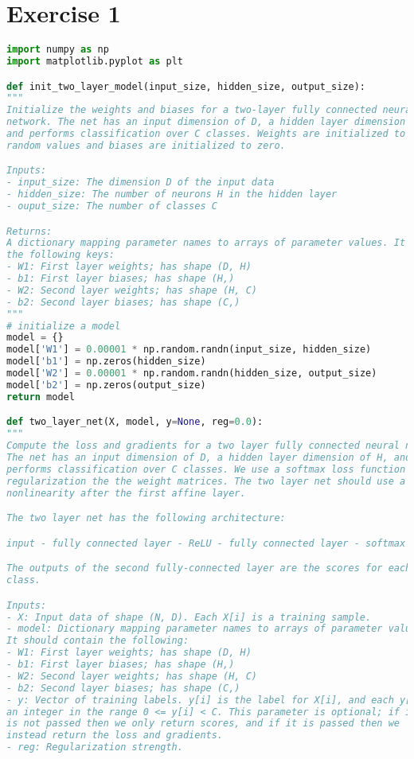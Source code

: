 \chapter{Exercise 1}








\begin{lstlisting}[language=Python, label=lst:neuralnet.py, caption={neural\_net.py}, basicstyle=\tiny]
import numpy as np
import matplotlib.pyplot as plt

def init_two_layer_model(input_size, hidden_size, output_size):
"""
Initialize the weights and biases for a two-layer fully connected neural
network. The net has an input dimension of D, a hidden layer dimension of H,
and performs classification over C classes. Weights are initialized to small
random values and biases are initialized to zero.

Inputs:
- input_size: The dimension D of the input data
- hidden_size: The number of neurons H in the hidden layer
- ouput_size: The number of classes C

Returns:
A dictionary mapping parameter names to arrays of parameter values. It has
the following keys:
- W1: First layer weights; has shape (D, H)
- b1: First layer biases; has shape (H,)
- W2: Second layer weights; has shape (H, C)
- b2: Second layer biases; has shape (C,)
"""
# initialize a model
model = {}
model['W1'] = 0.00001 * np.random.randn(input_size, hidden_size)
model['b1'] = np.zeros(hidden_size)
model['W2'] = 0.00001 * np.random.randn(hidden_size, output_size)
model['b2'] = np.zeros(output_size)
return model

def two_layer_net(X, model, y=None, reg=0.0):
"""
Compute the loss and gradients for a two layer fully connected neural network.
The net has an input dimension of D, a hidden layer dimension of H, and
performs classification over C classes. We use a softmax loss function and L2
regularization the the weight matrices. The two layer net should use a ReLU
nonlinearity after the first affine layer.

The two layer net has the following architecture:

input - fully connected layer - ReLU - fully connected layer - softmax

The outputs of the second fully-connected layer are the scores for each
class.

Inputs:
- X: Input data of shape (N, D). Each X[i] is a training sample.
- model: Dictionary mapping parameter names to arrays of parameter values.
It should contain the following:
- W1: First layer weights; has shape (D, H)
- b1: First layer biases; has shape (H,)
- W2: Second layer weights; has shape (H, C)
- b2: Second layer biases; has shape (C,)
- y: Vector of training labels. y[i] is the label for X[i], and each y[i] is
an integer in the range 0 <= y[i] < C. This parameter is optional; if it
is not passed then we only return scores, and if it is passed then we
instead return the loss and gradients.
- reg: Regularization strength.


\end{lstlisting}
